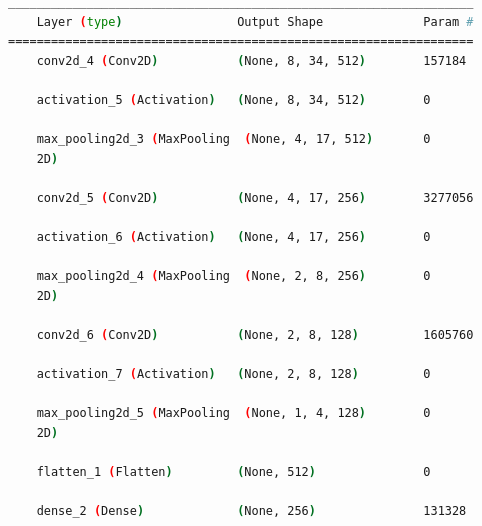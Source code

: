 \begin{lstlisting}[language=Bash,caption={Overview of layers in Custom 2D Convolutional network built into the Custom LSTM Network in \cref{lst:custom_conv_lstm_layers}.},label={lst:custom_conv_2d_layers},numbers=none,float=htb]
_________________________________________________________________
    Layer (type)                Output Shape              Param #   
=================================================================
    conv2d_4 (Conv2D)           (None, 8, 34, 512)        157184    
                                                                    
    activation_5 (Activation)   (None, 8, 34, 512)        0         
                                                                    
    max_pooling2d_3 (MaxPooling  (None, 4, 17, 512)       0         
    2D)                                                             
                                                                    
    conv2d_5 (Conv2D)           (None, 4, 17, 256)        3277056   
                                                                    
    activation_6 (Activation)   (None, 4, 17, 256)        0         
                                                                    
    max_pooling2d_4 (MaxPooling  (None, 2, 8, 256)        0         
    2D)                                                             
                                                                    
    conv2d_6 (Conv2D)           (None, 2, 8, 128)         1605760   
                                                                    
    activation_7 (Activation)   (None, 2, 8, 128)         0         
                                                                    
    max_pooling2d_5 (MaxPooling  (None, 1, 4, 128)        0         
    2D)                                                             
                                                                    
    flatten_1 (Flatten)         (None, 512)               0         
                                                                    
    dense_2 (Dense)             (None, 256)               131328    
                                                                    

\end{lstlisting}

